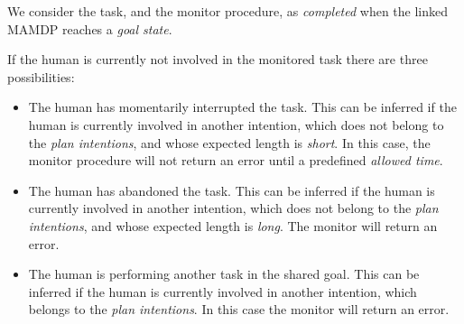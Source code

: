  We consider the task, and the monitor procedure, as \textit{completed} when the linked MAMDP reaches a \textit{goal state}.

If the human is currently not involved in the monitored task there are three possibilities:
\begin{itemize}
	\item The human has momentarily interrupted the task. This can be inferred if the human is currently involved in another intention, which does not belong to the \textit{plan intentions}, and whose expected length is \textit{short}. In this case, the monitor procedure will not return an error until a predefined \textit{allowed time}.
	\item The human has abandoned the task.  This can be inferred if the human is currently involved in another intention, which does not belong to the \textit{plan intentions}, and whose expected length is \textit{long}. The monitor will return an error. 
	\item The human is performing another task in the shared goal. This can be inferred if the human is currently involved in another intention, which belongs to the \textit{plan intentions}. In this case the monitor will return an error. 
\end{itemize}




